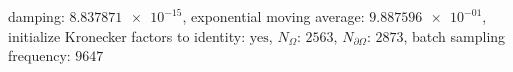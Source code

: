 damping: $\num[scientific-notation=true]{8.837871e-15}$, exponential moving average: $\num[scientific-notation=true]{9.887596e-01}$, initialize Kronecker factors to identity: $\text{yes}$, $N_{\Omega}$: $\num[scientific-notation=false]{2563}$, $N_{\partial\Omega}$: $\num[scientific-notation=false]{2873}$, batch sampling frequency: $\num[scientific-notation=false]{9647}$